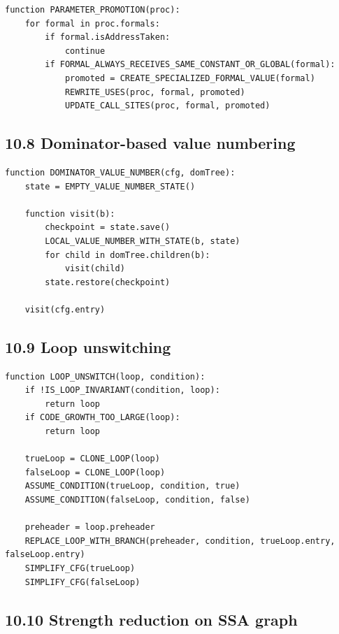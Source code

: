 \documentclass[10pt,letterpaper]{article}
\begin{document}
\begin{verbatim}
function PARAMETER_PROMOTION(proc):
    for formal in proc.formals:
        if formal.isAddressTaken:
            continue
        if FORMAL_ALWAYS_RECEIVES_SAME_CONSTANT_OR_GLOBAL(formal):
            promoted = CREATE_SPECIALIZED_FORMAL_VALUE(formal)
            REWRITE_USES(proc, formal, promoted)
            UPDATE_CALL_SITES(proc, formal, promoted)
\end{verbatim}

\subsection*{10.8 Dominator-based value numbering}
{}

\begin{verbatim}
function DOMINATOR_VALUE_NUMBER(cfg, domTree):
    state = EMPTY_VALUE_NUMBER_STATE()

    function visit(b):
        checkpoint = state.save()
        LOCAL_VALUE_NUMBER_WITH_STATE(b, state)
        for child in domTree.children(b):
            visit(child)
        state.restore(checkpoint)

    visit(cfg.entry)
\end{verbatim}

\subsection*{10.9 Loop unswitching}
{}

\begin{verbatim}
function LOOP_UNSWITCH(loop, condition):
    if !IS_LOOP_INVARIANT(condition, loop):
        return loop
    if CODE_GROWTH_TOO_LARGE(loop):
        return loop

    trueLoop = CLONE_LOOP(loop)
    falseLoop = CLONE_LOOP(loop)
    ASSUME_CONDITION(trueLoop, condition, true)
    ASSUME_CONDITION(falseLoop, condition, false)

    preheader = loop.preheader
    REPLACE_LOOP_WITH_BRANCH(preheader, condition, trueLoop.entry, falseLoop.entry)
    SIMPLIFY_CFG(trueLoop)
    SIMPLIFY_CFG(falseLoop)
\end{verbatim}

\subsection*{10.10 Strength reduction on SSA graph}
{}
\end{document}
